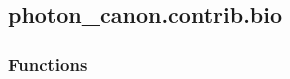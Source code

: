 \documentclass[letterpaper,10pt,english]{sphinxmanual}
\begin{document}
\sphinxstepscope


\subsection{photon\_canon.contrib.bio}
\label{\detokenize{generated/photon_canon.contrib.bio:module-photon_canon.contrib.bio}}\label{\detokenize{generated/photon_canon.contrib.bio:photon-canon-contrib-bio}}\label{\detokenize{generated/photon_canon.contrib.bio::doc}}\subsubsection*{Functions}
\end{document}
